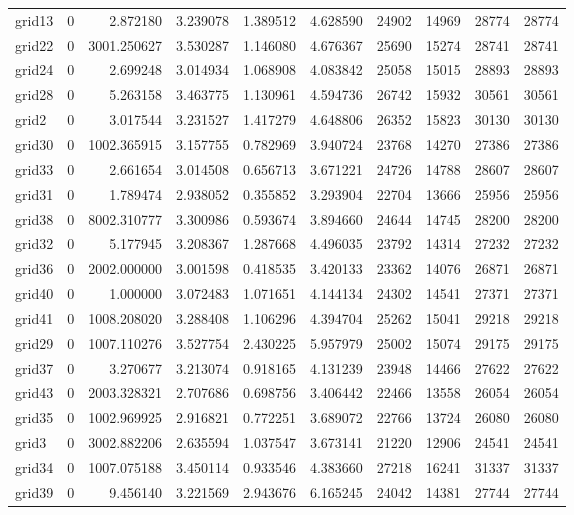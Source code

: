 \begin{longtable}{|l|r|r|r|r|r|r|r|r|r|}
grid13 & 0 & 2.872180 & 3.239078 & 1.389512 & 4.628590 & 24902 & 14969 & 28774 & 28774 \\
grid22 & 0 & 3001.250627 & 3.530287 & 1.146080 & 4.676367 & 25690 & 15274 & 28741 & 28741 \\
grid24 & 0 & 2.699248 & 3.014934 & 1.068908 & 4.083842 & 25058 & 15015 & 28893 & 28893 \\
grid28 & 0 & 5.263158 & 3.463775 & 1.130961 & 4.594736 & 26742 & 15932 & 30561 & 30561 \\
grid2 & 0 & 3.017544 & 3.231527 & 1.417279 & 4.648806 & 26352 & 15823 & 30130 & 30130 \\
grid30 & 0 & 1002.365915 & 3.157755 & 0.782969 & 3.940724 & 23768 & 14270 & 27386 & 27386 \\
grid33 & 0 & 2.661654 & 3.014508 & 0.656713 & 3.671221 & 24726 & 14788 & 28607 & 28607 \\
grid31 & 0 & 1.789474 & 2.938052 & 0.355852 & 3.293904 & 22704 & 13666 & 25956 & 25956 \\
grid38 & 0 & 8002.310777 & 3.300986 & 0.593674 & 3.894660 & 24644 & 14745 & 28200 & 28200 \\
grid32 & 0 & 5.177945 & 3.208367 & 1.287668 & 4.496035 & 23792 & 14314 & 27232 & 27232 \\
grid36 & 0 & 2002.000000 & 3.001598 & 0.418535 & 3.420133 & 23362 & 14076 & 26871 & 26871 \\
grid40 & 0 & 1.000000 & 3.072483 & 1.071651 & 4.144134 & 24302 & 14541 & 27371 & 27371 \\
grid41 & 0 & 1008.208020 & 3.288408 & 1.106296 & 4.394704 & 25262 & 15041 & 29218 & 29218 \\
grid29 & 0 & 1007.110276 & 3.527754 & 2.430225 & 5.957979 & 25002 & 15074 & 29175 & 29175 \\
grid37 & 0 & 3.270677 & 3.213074 & 0.918165 & 4.131239 & 23948 & 14466 & 27622 & 27622 \\
grid43 & 0 & 2003.328321 & 2.707686 & 0.698756 & 3.406442 & 22466 & 13558 & 26054 & 26054 \\
grid35 & 0 & 1002.969925 & 2.916821 & 0.772251 & 3.689072 & 22766 & 13724 & 26080 & 26080 \\
grid3 & 0 & 3002.882206 & 2.635594 & 1.037547 & 3.673141 & 21220 & 12906 & 24541 & 24541 \\
grid34 & 0 & 1007.075188 & 3.450114 & 0.933546 & 4.383660 & 27218 & 16241 & 31337 & 31337 \\
grid39 & 0 & 9.456140 & 3.221569 & 2.943676 & 6.165245 & 24042 & 14381 & 27744 & 27744 \\

\end{longtable}
